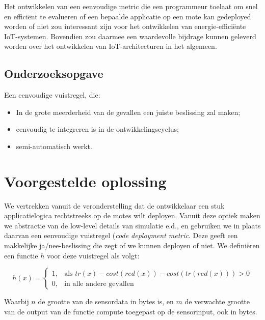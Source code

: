 \documentclass{article}
\begin{document}
Het ontwikkelen van een eenvoudige metric die een programmeur toelaat om snel en
efficiënt te evalueren of een bepaalde applicatie op een mote kan gedeployed
worden of niet zou interessant zijn voor het ontwikkelen van
energie-effici\"ente IoT-systemen. Bovendien zou daarmee een waardevolle
bijdrage kunnen geleverd worden over het ontwikkelen van IoT-architecturen in
het algemeen.

\subsection{Onderzoeksopgave}

Een eenvoudige vuistregel, die:
\begin{itemize}
\item In de grote meerderheid van de gevallen een juiste beslissing zal maken;
\item eenvoudig te integreren is in de ontwikkelingscyclus;
\item semi-automatisch werkt.
\end{itemize}

\section{Voorgestelde oplossing}
We vertrekken vanuit de veronderstelling dat de ontwikkelaar een stuk
applicatielogica rechtstreeks op de motes wilt deployen. Vanuit deze optiek
maken we abstractie van de low-level details van simulatie e.d., en gebruiken we
in plaats daarvan een eenvoudige vuistregel (\textit{code deployment
metric}. Deze geeft een makkelijke ja/nee-beslissing die zegt of we kunnen
deployen of niet. We defini\"eren een functie $h$ voor deze vuistregel als
volgt:

\[
h(x)= 
\begin{cases}
  1, & \text{als } tr(x) - cost(red(x)) - cost(tr(red(x))) > 0  \\
  0, & \text{in alle andere gevallen}
\end{cases}
\]

Waarbij $n$ de grootte van de sensordata in bytes is, en $m$ de verwachte
grootte van de output van de functie compute toegepast op de sensorinput, ook in
bytes.
\end{document}
